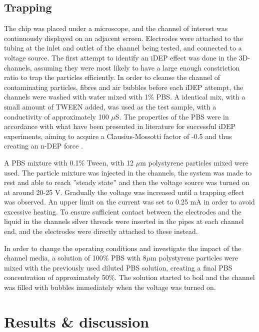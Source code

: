 \documentclass[journal, a4paper]{IEEEtran}
\begin{document}
\subsection{Trapping}
The chip was placed under a microscope, and the channel of interest was continuously displayed on an adjacent screen. Electrodes were attached to the tubing at the inlet and outlet of the channel being tested, and connected to a voltage source. The first attempt to identify an iDEP effect was done in the 3D-channels, assuming they were most likely to have a large enough constriction ratio to trap the particles efficiently. In order to cleanse the channel of contaminating particles, fibres and air bubbles before each iDEP attempt, the channels were washed with water mixed with 1\% PBS. A identical mix, with a small amount of TWEEN added, was used as the test sample, with a conductivity of approximately 100 $\mu$S. The properties of the PBS were in accordance with what have been presented in literature for successful iDEP experiments, aiming to acquire a Clausius-Mossotti factor of -0.5 and thus creating an n-DEP force \cite{Braff:12}.

A PBS mixture with 0.1\% Tween, with 12 $\mu$m polystyrene particles mixed were used. The particle mixture was injected in the channels, the system was made to rest and able to reach ''steady state'' and then the voltage source was turned on at around 20-25 V. Gradually the voltage was increased until a trapping effect was observed. An upper limit on the current was set to 0.25 mA in order to avoid excessive heating. To ensure sufficient contact between the electrodes and the liquid in the channels silver threads were inserted in the pipes at each channel end, and the electrodes were directly attached to these instead. 

In order to change the operating conditions and investigate the impact of the channel media, a solution of 100\% PBS with 8$\mu$m polystyrene particles were mixed with the previously used diluted PBS solution, creating a final PBS concentration of approximately 50\%. The solution started to boil and the channel was filled with bubbles immediately when the voltage was turned on.
   
\section{Results \& discussion}
\end{document}
